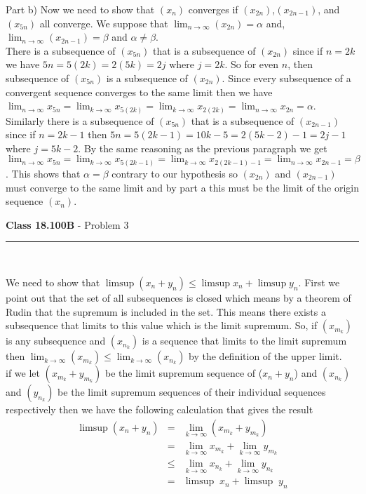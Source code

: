 \documentclass[11pt,reqno]{article}
\begin{document}
\noindent Part b) Now we need to show that $(x_n)$ converges if $(x_{2n})$,$(x_{2n-1})$, and $(x_{5n})$ all converge. We suppose that $\lim_{n \to \infty}(x_{2n}) = \alpha$ and, $\lim_{n \to \infty}(x_{2n-1}) = \beta$ and $\alpha \neq \beta$. \\
\indent There is a subsequence of $(x_{5n})$ that is a subsequence of $(x_{2n})$ since if $n = 2k$ we have $5n = 5(2k) = 2(5k) = 2j$ where $j = 2k$. So for even $n$, then subsequence of $(x_{5n})$ is a subsequence of $(x_{2n})$. Since every subsequence of a convergent sequence converges to the same limit then we have $\lim_{n \to \infty}x_{5n} = \lim_{k \to \infty} x_{5(2k)} = \lim_{k \to \infty}x_{2(2k)} = \lim_{n \to \infty}x_{2n} = \alpha$.\\
\indent Similarly there is a subsequence of $(x_{5n})$ that is a subsequence of $(x_{2n-1})$   since if $n = 2k-1$ then $5n = 5(2k-1) = 10k -5 = 2(5k-2)-1= 2j-1$ where $j=5k-2$. By the same reasoning as the previous paragraph we get $\lim_{n \to \infty}x_{5n} = \lim_{k \to \infty} x_{5(2k-1)} = \lim_{k \to \infty}x_{2(2k-1)-1} = \lim_{n \to \infty}x_{2n-1} = \beta$. This shows that $\alpha = \beta$ contrary to our hypothesis so  $(x_{2n})$ and $(x_{2n-1})$ must converge to the same limit and by part a this must be the limit of the origin sequence $(x_n)$.

\vspace{15pt}
\begin{flushleft} 
\textbf{Class 18.100B} - Problem 3\\
\rule{500pt}{1pt}\\
\end{flushleft} 

We need to show that  $\limsup (x_n + y_n) \le \limsup x_n + \limsup y_n$. First we point out that the set of all subsequences is closed which means by a theorem of Rudin that the supremum is included in the set. This means there exists a subsequence that limits to this value which is the limit supremum. So, if $(x_{m_k})$ is any subsequence and $(x_{n_k})$ is a sequence that limits to the limit supremum then  $\lim_{k \to \infty}(x_{m_k}) \le \lim_{k \to \infty}(x_{n_k})$ by the definition of the upper limit.\\
\indent if we let $(x_{m_k} + y_{m_k})$ be the limit supremum sequence of ($x_n + y_n$)  and $(x_{n_k})$ and $(y_{n_k})$ be the limit supremum sequences of their individual sequences respectively then we have the following calculation that gives the result
\begin{eqnarray*}
\limsup (x_n + y_n) & = & \lim_{k \to \infty}(x_{m_k} + y_{m_k}) \\
			      & = & \lim_{k \to \infty} x_{m_k} + \lim_{k \to \infty}y_{m_k}\\
                                          & \le & \lim_{k \to \infty} x_{n_k} + \lim_{k \to \infty}y_{n_k}\\
			      & = & \limsup \; x_n + \limsup \;y_n
\end{eqnarray*}
\end{document}
